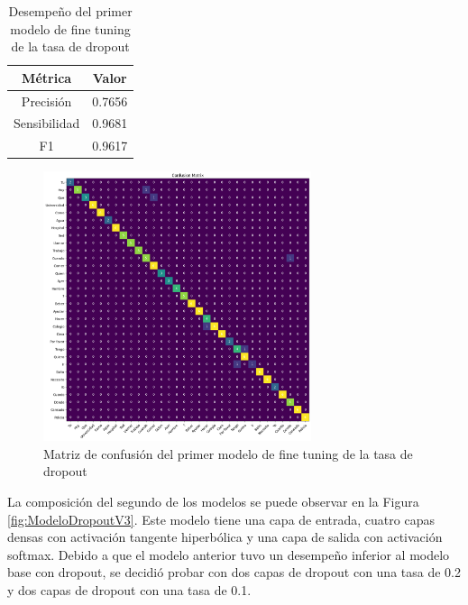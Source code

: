 \begin{table}[H]
    \centering
    \begin{tabular}{|c|c|}
        \hline
        \textbf{Métrica} & \textbf{Valor} \\
        \hline
        Precisión & 0.7656 \\
        \hline
        Sensibilidad & 0.9681 \\
        \hline
        F1 & 0.9617 \\
        \hline
    \end{tabular}
    \caption{Desempeño del primer modelo de fine tuning de la tasa de dropout}
    \label{tab:DesempeñoModeloDropoutV2}
\end{table}

\begin{figure}[H]
    \centering
    \includegraphics[width=0.7\textwidth]{figuras/modelDropoutV2CM.png}
    \caption{Matriz de confusión del primer modelo de fine tuning de la tasa de dropout}
    \label{fig:CMModeloDropoutV2}
\end{figure}

La composición del segundo de los modelos se puede observar en la Figura \ref{fig:ModeloDropoutV3}.
Este modelo tiene una capa de entrada, cuatro capas densas con activación tangente hiperbólica y una capa de salida con activación softmax.
Debido a que el modelo anterior tuvo un desempeño inferior al modelo base con dropout, se decidió probar con dos capas de dropout con una tasa de 0.2 y dos capas de dropout con una tasa de 0.1.

